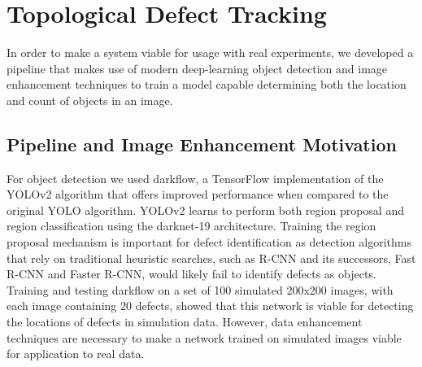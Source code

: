 \documentclass[prl,reprint,showpacs,floatfix,nofootinbib]{revtex4-1}
\begin{document}




\section{Topological Defect Tracking}

In order to make a system viable for usage with real experiments, we developed a pipeline that makes use of modern deep-learning object detection and image enhancement techniques to train a model capable determining both the location and count of objects in an image. 

\subsection{Pipeline and Image Enhancement Motivation}
For object detection we used darkflow\cite{trinh_darkflow_2018}, a TensorFlow implementation of the YOLOv2 algorithm \cite{redmon_yolo9000:_2016} that offers improved performance when compared to the original YOLO algorithm\cite{redmon_you_2015}. YOLOv2 learns to perform both region proposal and region classification using the darknet-19 architecture. Training the region proposal mechanism is important for defect identification as detection algorithms that rely on traditional heuristic searches, such as R-CNN\cite{girshick_rich_2013} and its successors, Fast R-CNN\cite{girshick_fast_2015} and Faster R-CNN\cite{ren_faster_2017}, would likely fail to identify defects as objects. Training and testing darkflow on a set of 100 simulated 200x200 images, with each image containing 20 defects, showed that this network is viable for detecting the locations of defects in simulation data. However, data enhancement techniques are necessary to make a network trained on simulated images viable for application to real data.
\end{document}
